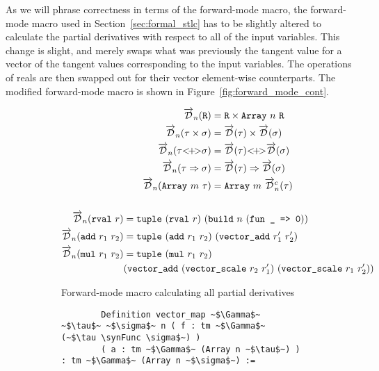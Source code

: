   As we will phrase correctness in terms of the forward-mode macro, the forward-mode macro used in Section~\ref{sec:formal_stlc} has to be slightly altered to calculate the partial derivatives with respect to all of the input variables.
  This change is slight, and merely swaps what was previously the tangent value for a vector of the tangent values corresponding to the input variables.
  The operations of reals are then swapped out for their vector element-wise counterparts.
  The modified forward-mode macro is shown in Figure~\ref{fig:forward_mode_cont}.

  \begin{figure}
    \centering
    \begin{subfigure}{1\textwidth}
      \begin{gather*}
        \begin{aligned}
          \overrightarrow{\mathcal{D}}_n(\texttt{R}) &= \texttt{R} \times \texttt{Array}\ n\ \texttt{R} \\
          \overrightarrow{\mathcal{D}}_n(\tau \times \sigma) &= \overrightarrow{\mathcal{D}}(\tau) \times \overrightarrow{\mathcal{D}}(\sigma) \\
          \overrightarrow{\mathcal{D}}_n(\tau {<}\!{+}\!{>} \sigma) &= \overrightarrow{\mathcal{D}}(\tau) {<}\!{+}\!{>} \overrightarrow{\mathcal{D}}(\sigma) \\
          \overrightarrow{\mathcal{D}}_n(\tau \Rightarrow \sigma) &= \overrightarrow{\mathcal{D}}(\tau) \Rightarrow \overrightarrow{\mathcal{D}}(\sigma) \\
          \overrightarrow{\mathcal{D}}_n(\texttt{Array}\ m\ \tau) &= \texttt{Array}\ m\ \overrightarrow{\mathcal{D}}^c_n(\tau)
        \end{aligned} \\ \\
        \begin{aligned}
          \overrightarrow{\mathcal{D}}_n(\texttt{rval}\ r) &= \texttt{tuple}\ (\texttt{rval}\ r)\ (\texttt{build}\ n\ (\texttt{fun \_ => 0})) \\
          \overrightarrow{\mathcal{D}}_n(\texttt{add}\ r_1\ r_2) &= \texttt{tuple}\ (\texttt{add}\ r_1\ r_2)\ (\texttt{vector\_add}\ r_1'\ r_2') \\
          \overrightarrow{\mathcal{D}}_n(\texttt{mul}\ r_1\ r_2) &= \texttt{tuple}\ (\texttt{mul}\ r_1\ r_2)\ \\&(\texttt{vector\_add}\ (\texttt{vector\_scale}\ r_2\ r_1')\ (\texttt{vector\_scale}\ r_1\ r_2'))
        \end{aligned}
      \end{gather*}
      \caption{Forward-mode macro calculating all partial derivatives}
    \end{subfigure}
    \begin{subfigure}{1\textwidth}
      \begin{verbatim}
        Definition vector_map ~$\Gamma$~ ~$\tau$~ ~$\sigma$~ n ( f : tm ~$\Gamma$~ (~$\tau \synFunc \sigma$~) )
        ( a : tm ~$\Gamma$~ (Array n ~$\tau$~) ) : tm ~$\Gamma$~ (Array n ~$\sigma$~) :=

\end{verbatim}
\end{subfigure}
\end{figure}

